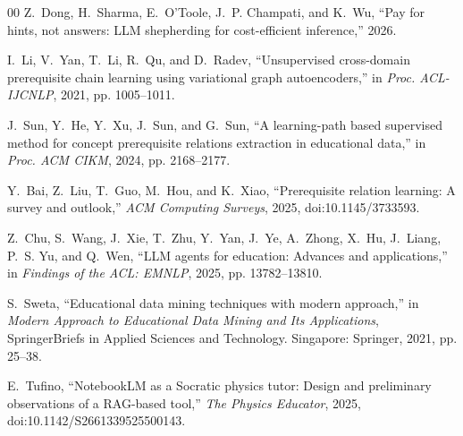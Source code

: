 \documentclass[conference]{IEEEtran}
\begin{document}
\begin{thebibliography}{00}
Z.~Dong, H.~Sharma, E.~O'Toole, J.~P. Champati, and K.~Wu, ``Pay for hints,
not answers: LLM shepherding for cost-efficient inference,'' 2026.

I.~Li, V.~Yan, T.~Li, R.~Qu, and D.~Radev, ``Unsupervised cross-domain
prerequisite chain learning using variational graph autoencoders,'' in
\emph{Proc. ACL-IJCNLP}, 2021, pp. 1005--1011.

J.~Sun, Y.~He, Y.~Xu, J.~Sun, and G.~Sun, ``A learning-path based supervised
method for concept prerequisite relations extraction in educational data,''
in \emph{Proc. ACM CIKM}, 2024, pp. 2168--2177.

Y.~Bai, Z.~Liu, T.~Guo, M.~Hou, and K.~Xiao, ``Prerequisite relation learning:
A survey and outlook,'' \emph{ACM Computing Surveys}, 2025,
doi:10.1145/3733593.

Z.~Chu, S.~Wang, J.~Xie, T.~Zhu, Y.~Yan, J.~Ye, A.~Zhong, X.~Hu, J.~Liang,
P.~S. Yu, and Q.~Wen, ``LLM agents for education: Advances and
applications,'' in \emph{Findings of the ACL: EMNLP}, 2025, pp. 13782--13810.

S.~Sweta, ``Educational data mining techniques with modern approach,'' in
\emph{Modern Approach to Educational Data Mining and Its Applications},
SpringerBriefs in Applied Sciences and Technology. Singapore: Springer, 2021,
pp. 25--38.

E.~Tufino, ``NotebookLM as a Socratic physics tutor: Design and preliminary
observations of a RAG-based tool,'' \emph{The Physics Educator}, 2025,
doi:10.1142/S2661339525500143.

\end{thebibliography}
\end{document}
